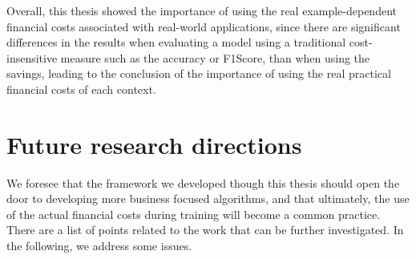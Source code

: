 Overall, this thesis showed the importance of using the real example-dependent financial 
costs associated with real-world applications, since there are significant differences in the 
results when evaluating a model using a traditional cost-insensitive measure such as the accuracy 
or F1Score,  than when using the savings, leading to the conclusion of the importance of using the 
real practical financial costs of each context.


\section{Future research directions}

We foresee that the framework we developed though this thesis should open the door to developing 
more business focused algorithms, and that ultimately, the use of the actual financial costs during 
training will become a common practice. There are a list of points related to the work that can be 
further investigated. In the following, we address some issues. 

